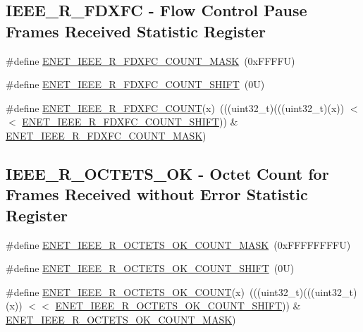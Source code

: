 \subsection*{I\+E\+E\+E\+\_\+\+R\+\_\+\+F\+D\+X\+FC -\/ Flow Control Pause Frames Received Statistic Register}
\begin{DoxyCompactItemize}
\item 
\#define \mbox{\hyperlink{group___e_n_e_t___register___masks_gae1bb815cfd879ec0c78889dfcb089247}{E\+N\+E\+T\+\_\+\+I\+E\+E\+E\+\_\+\+R\+\_\+\+F\+D\+X\+F\+C\+\_\+\+C\+O\+U\+N\+T\+\_\+\+M\+A\+SK}}~(0x\+F\+F\+F\+F\+U)
\item 
\#define \mbox{\hyperlink{group___e_n_e_t___register___masks_ga31cd2bb10ff9c6d13dc7fede6f4d54d3}{E\+N\+E\+T\+\_\+\+I\+E\+E\+E\+\_\+\+R\+\_\+\+F\+D\+X\+F\+C\+\_\+\+C\+O\+U\+N\+T\+\_\+\+S\+H\+I\+FT}}~(0\+U)
\item 
\#define \mbox{\hyperlink{group___e_n_e_t___register___masks_ga7ca7799d3ca80b9a7927af20025f6cf9}{E\+N\+E\+T\+\_\+\+I\+E\+E\+E\+\_\+\+R\+\_\+\+F\+D\+X\+F\+C\+\_\+\+C\+O\+U\+NT}}(x)~(((uint32\+\_\+t)(((uint32\+\_\+t)(x)) $<$$<$ \mbox{\hyperlink{group___e_n_e_t___register___masks_ga31cd2bb10ff9c6d13dc7fede6f4d54d3}{E\+N\+E\+T\+\_\+\+I\+E\+E\+E\+\_\+\+R\+\_\+\+F\+D\+X\+F\+C\+\_\+\+C\+O\+U\+N\+T\+\_\+\+S\+H\+I\+FT}})) \& \mbox{\hyperlink{group___e_n_e_t___register___masks_gae1bb815cfd879ec0c78889dfcb089247}{E\+N\+E\+T\+\_\+\+I\+E\+E\+E\+\_\+\+R\+\_\+\+F\+D\+X\+F\+C\+\_\+\+C\+O\+U\+N\+T\+\_\+\+M\+A\+SK}})
\end{DoxyCompactItemize}
\subsection*{I\+E\+E\+E\+\_\+\+R\+\_\+\+O\+C\+T\+E\+T\+S\+\_\+\+OK -\/ Octet Count for Frames Received without Error Statistic Register}
\begin{DoxyCompactItemize}
\item 
\#define \mbox{\hyperlink{group___e_n_e_t___register___masks_gab0a6815c67b330a4261dae4a7da445b5}{E\+N\+E\+T\+\_\+\+I\+E\+E\+E\+\_\+\+R\+\_\+\+O\+C\+T\+E\+T\+S\+\_\+\+O\+K\+\_\+\+C\+O\+U\+N\+T\+\_\+\+M\+A\+SK}}~(0x\+F\+F\+F\+F\+F\+F\+F\+F\+U)
\item 
\#define \mbox{\hyperlink{group___e_n_e_t___register___masks_ga8a406cf6c9e91cc4a0217bd3f885ab05}{E\+N\+E\+T\+\_\+\+I\+E\+E\+E\+\_\+\+R\+\_\+\+O\+C\+T\+E\+T\+S\+\_\+\+O\+K\+\_\+\+C\+O\+U\+N\+T\+\_\+\+S\+H\+I\+FT}}~(0\+U)
\item 
\#define \mbox{\hyperlink{group___e_n_e_t___register___masks_ga45f6f91b88631d8bf05f2fdf05687bde}{E\+N\+E\+T\+\_\+\+I\+E\+E\+E\+\_\+\+R\+\_\+\+O\+C\+T\+E\+T\+S\+\_\+\+O\+K\+\_\+\+C\+O\+U\+NT}}(x)~(((uint32\+\_\+t)(((uint32\+\_\+t)(x)) $<$$<$ \mbox{\hyperlink{group___e_n_e_t___register___masks_ga8a406cf6c9e91cc4a0217bd3f885ab05}{E\+N\+E\+T\+\_\+\+I\+E\+E\+E\+\_\+\+R\+\_\+\+O\+C\+T\+E\+T\+S\+\_\+\+O\+K\+\_\+\+C\+O\+U\+N\+T\+\_\+\+S\+H\+I\+FT}})) \& \mbox{\hyperlink{group___e_n_e_t___register___masks_gab0a6815c67b330a4261dae4a7da445b5}{E\+N\+E\+T\+\_\+\+I\+E\+E\+E\+\_\+\+R\+\_\+\+O\+C\+T\+E\+T\+S\+\_\+\+O\+K\+\_\+\+C\+O\+U\+N\+T\+\_\+\+M\+A\+SK}})
\end{DoxyCompactItemize}

